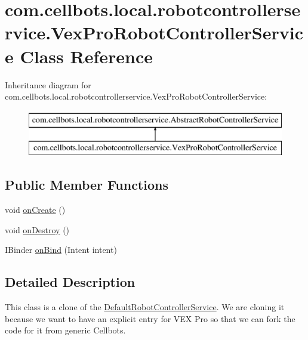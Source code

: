 \hypertarget{classcom_1_1cellbots_1_1local_1_1robotcontrollerservice_1_1_vex_pro_robot_controller_service}{\section{com.\-cellbots.\-local.\-robotcontrollerservice.\-Vex\-Pro\-Robot\-Controller\-Service Class Reference}
\label{classcom_1_1cellbots_1_1local_1_1robotcontrollerservice_1_1_vex_pro_robot_controller_service}
}
Inheritance diagram for com.\-cellbots.\-local.\-robotcontrollerservice.\-Vex\-Pro\-Robot\-Controller\-Service\-:\begin{figure}[H]
\begin{center}
\leavevmode
\includegraphics[height=2.000000cm]{classcom_1_1cellbots_1_1local_1_1robotcontrollerservice_1_1_vex_pro_robot_controller_service}
\end{center}
\end{figure}
\subsection*{Public Member Functions}
\begin{DoxyCompactItemize}
\item 
void \hyperlink{classcom_1_1cellbots_1_1local_1_1robotcontrollerservice_1_1_vex_pro_robot_controller_service_a3dc8d641ef0278e8486f43efa0fc907b}{on\-Create} ()
\item 
void \hyperlink{classcom_1_1cellbots_1_1local_1_1robotcontrollerservice_1_1_vex_pro_robot_controller_service_aa724f750ddb5104a09f4dd06ef863d7e}{on\-Destroy} ()
\item 
I\-Binder \hyperlink{classcom_1_1cellbots_1_1local_1_1robotcontrollerservice_1_1_vex_pro_robot_controller_service_a9446599f7f211a5793d2a5768585ff20}{on\-Bind} (Intent intent)
\end{DoxyCompactItemize}


\subsection{Detailed Description}
This class is a clone of the \hyperlink{classcom_1_1cellbots_1_1local_1_1robotcontrollerservice_1_1_default_robot_controller_service}{Default\-Robot\-Controller\-Service}. We are cloning it because we want to have an explicit entry for V\-E\-X Pro so that we can fork the code for it from generic Cellbots.

